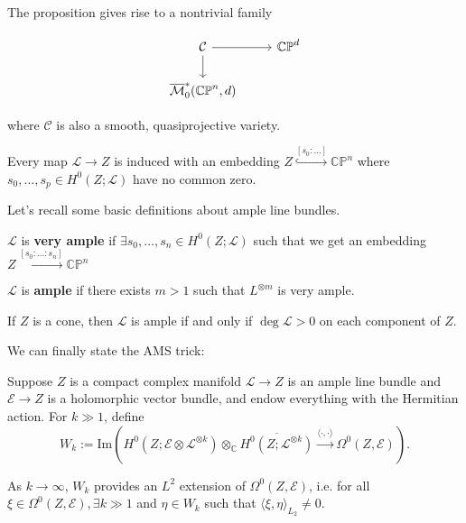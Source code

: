 The proposition gives rise to a nontrivial family

\[
\begin{tikzcd}
	{\mathcal{C}} & {\mathbb{CP}^d} \\
	{\overline{\mathcal{M}}_0^*(\mathbb{CP}^n, d)}
	\arrow[from=1-1, to=1-2]
	\arrow[from=1-1, to=2-1]
\end{tikzcd}
\]

where $\mathcal{C}$ is also a smooth, quasiprojective variety.

Every map $\mathcal{L}\to Z$ is induced with an embedding $Z\stackrel{[s_0:... ]}{\hookrightarrow} \mathbb{CP}^n$ where $s_0, ..., s_p \in H^0(Z; \mathcal{L})$ have no common zero.

Let's recall some basic definitions about ample line bundles.

\begin{definition}

$\mathcal{L}$ is \textbf{very ample} if $\exists s_0,...,s_n \in H^0(Z; \mathcal{L})$ such that we get an embedding $Z\stackrel{[s_0:...:s_n]}{\hookrightarrow} \mathbb{CP}^n$

\end{definition}

\begin{definition}

$ \mathcal{L}$ is \textbf{ample} if there exists $m>1$ such that $L^{\otimes m}$ is very ample.

\end{definition}

\begin{proposition}
    If $Z$ is a cone, then $\mathcal{L}$ is ample if and only if $\deg \mathcal{L}>0$ on each component of $Z$.
\end{proposition}

We can finally state the AMS trick:

\begin{lemma}

Suppose $Z$ is a compact complex manifold $\mathcal{L}\to Z$ is an ample line bundle and $ \mathcal{E}\to Z$ is a holomorphic vector bundle, and endow everything with the Hermitian action. For $k\gg 1$, define
\[
W_k := \text{Im} \left( H^0(Z; \mathcal{E} \otimes \mathcal{L}^{\otimes k})\otimes_{\mathbb{C}} \overline{H^0(Z; \mathcal{L}^{\otimes k})} \stackrel{\langle \cdot, \cdot \rangle}{\longrightarrow} \Omega^0(Z, \mathcal{E})\right).
\]

As $k\to \infty$, $W_k$ provides an $L^2$ extension of $\Omega^0(Z, \mathcal{E})$, i.e. for all $\xi \in \Omega^0(Z, \mathcal{E}), \exists k\gg 1$ and $\eta \in W_k$ such that $\langle \xi, \eta \rangle_{L_2}\neq 0$.

\end{lemma}

